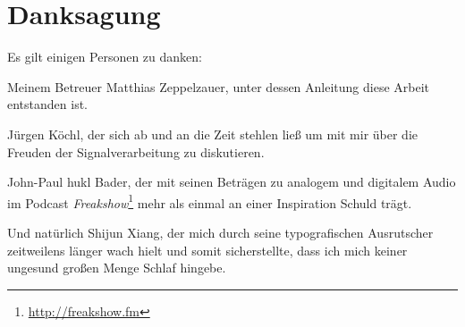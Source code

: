 \chapter*{Danksagung}

\noindent Es gilt einigen Personen zu danken:

\vspace{6mm}

\noindent Meinem Betreuer Matthias Zeppelzauer, unter dessen Anleitung diese Arbeit entstanden ist.

\vspace{6mm}

\noindent J\"urgen K\"ochl, der sich ab und an die Zeit stehlen lie{\ss} um mit mir über die Freuden der Signalverarbeitung zu diskutieren.

\vspace{6mm}

\noindent John-Paul \glqq hukl\grqq{} Bader, der mit seinen Betr\"agen zu analogem und digitalem Audio im Podcast \emph{Freakshow}\footnote{\url{http://freakshow.fm}} mehr als einmal an einer Inspiration Schuld tr\"agt. 

\vspace{6mm}

\noindent Und natürlich Shijun Xiang, der mich durch seine typografischen Ausrutscher zeitweilens l\"anger wach hielt und somit sicherstellte, dass ich mich keiner ungesund gro{\ss}en Menge Schlaf hingebe. 
